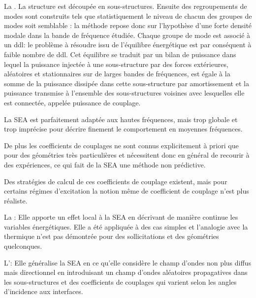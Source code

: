 \bigskip
La .
La structure est découpée en sous-structures.
Ensuite des regroupements de modes sont construits tels que statistiquement le niveau
de chacun des groupes de modes soit semblable : la méthode repose donc sur l'hypothèse
d'une forte densité modale dans la bande de fréquence étudiée.
Chaque groupe de mode est associé à un ddl: le problème à résoudre issu
de l'équilibre énergétique est par conséquent à faible nombre de ddl.
Cet équilibre se traduit par un bilan de puissance dans lequel la puissance injectée
à une sous-structure par des forces extérieures, aléatoires et stationnaires sur de
larges bandes de fréquences, est égale à la somme de la puissance dissipée
dans cette sous-structure par amortissement et la puissance transmise à l'ensemble
des sous-structures voisines avec lesquelles elle est connectée, appelée puissance
de couplage.

La SEA est parfaitement adaptée aux hautes fréquences, mais trop globale et trop imprécise pour
décrire finement le comportement en moyennes fréquences.

De plus les coefficients de couplages ne sont connus explicitement à priori que pour
des géométries très particulières et nécessitent donc en général de recourir
à des expériences, ce qui fait de la SEA une méthode non prédictive.

Des stratégies de calcul de ces coefficients de couplage existent, mais pour certains
régimes d'excitation la notion même de coefficient de couplage n'est plus réaliste.

\bigskip
La :
Elle apporte un effet local à la SEA en décrivant de manière continue les variables
énergétiques. Elle a été appliquée à des cas simples et l'analogie avec la thermique
n'est pas démontrée pour des sollicitations et des géométries quelconques.

\bigskip
L':
Elle généralise la SEA en ce qu'elle considère le champ d'ondes non plus diffus mais
directionnel en introduisant un champ d'ondes aléatoires propagatives dans les
sous-structures et des coefficients de couplages qui varient selon les angles
d'incidence aux interfaces.

